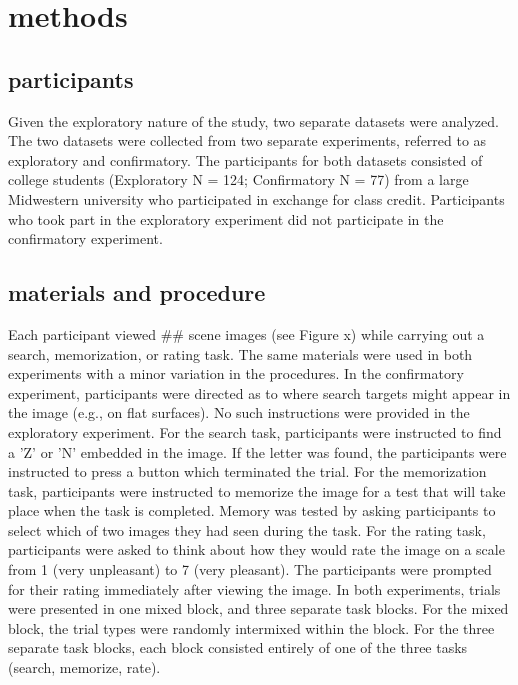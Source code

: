 \section{methods}

\subsection{participants}
Given the exploratory nature of the study, two separate datasets were analyzed. The two datasets were collected from two separate experiments, referred to as exploratory and confirmatory. The participants for both datasets consisted of college students (Exploratory N = 124; Confirmatory N = 77) from a large Midwestern university who participated in exchange for class credit. Participants who took part in the exploratory experiment did not participate in the confirmatory experiment. 

\subsection{materials and procedure}
Each participant viewed ## scene images (see Figure x) while carrying out a search, memorization, or rating task. The same materials were used in both experiments with a minor variation in the procedures. In the confirmatory experiment, participants were directed as to where search targets might appear in the image (e.g., on flat surfaces). No such instructions were provided in the exploratory experiment. For the search task, participants were instructed to find a 'Z' or 'N' embedded in the image. If the letter was found, the participants were instructed to press a button which terminated the trial. For the memorization task, participants were instructed to memorize the image for a test that will take place when the task is completed. Memory was tested by asking participants to select which of two images they had seen during the task. For the rating task, participants were asked to think about how they would rate the image on a scale from 1 (very unpleasant) to 7 (very pleasant). The participants were prompted for their rating immediately after viewing the image. In both experiments, trials were presented in one mixed block, and three separate task blocks. For the mixed block, the trial types were randomly intermixed within the block. For the three separate task blocks, each block consisted entirely of one of the three tasks (search, memorize, rate).


